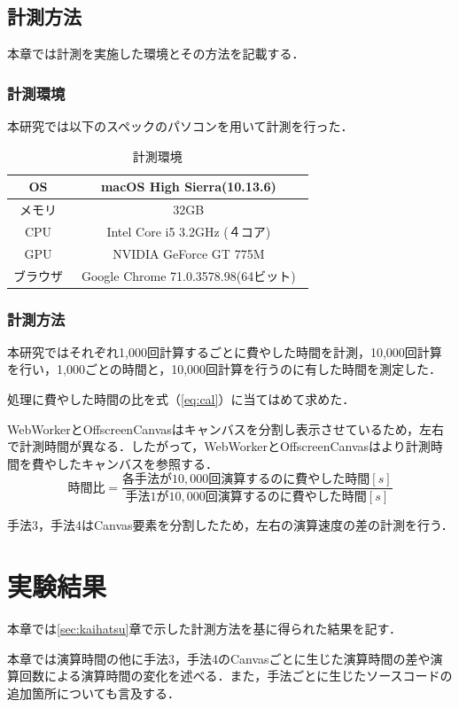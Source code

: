 \documentclass[a4j,12pt]{jsarticle}
\begin{document}
\subsection{計測方法}
本章では計測を実施した環境とその方法を記載する．
\subsubsection{計測環境}
本研究では以下のスペックのパソコンを用いて計測を行った．
\begin{table} [h]
\centering
\caption{計測環境}
	\begin{tabular} {| c | c |} \hline
	OS & macOS High Sierra(10.13.6) \\ \hline 
	メモリ & 32GB \\ \hline
	CPU & Intel Core i5 3.2GHz (４コア) \\ \hline
	GPU & NVIDIA GeForce GT 775M \\ \hline
	ブラウザ & Google Chrome 71.0.3578.98(64ビット)　\\ \hline
	\end{tabular} 
	\label{tab:tab1}
\end{table}

\subsubsection{計測方法}
本研究ではそれぞれ1,000回計算するごとに費やした時間を計測，10,000回計算を行い，1,000ごとの時間と，10,000回計算を行うのに有した時間を測定した．

処理に費やした時間の比を式（\ref{eq:cal}）に当てはめて求めた．

WebWorkerとOffscreenCanvasはキャンバスを分割し表示させているため，左右で計測時間が異なる．したがって，WebWorkerとOffscreenCanvasはより計測時間を費やしたキャンバスを参照する．
\begin{equation}
 時間比 = \frac { 各手法が10,000回演算するのに費やした時間 [s]} { 手法1が10,000回演算するのに費やした時間[s] } 
\label{eq:cal}
\end{equation}

手法3，手法4はCanvas要素を分割したため，左右の演算速度の差の計測を行う．
\newpage

\section{実験結果}
本章では\ref{sec:kaihatsu}章で示した計測方法を基に得られた結果を記す．

本章では演算時間の他に手法3，手法4のCanvasごとに生じた演算時間の差や演算回数による演算時間の変化を述べる．また，手法ごとに生じたソースコードの追加箇所についても言及する．
\end{document}
